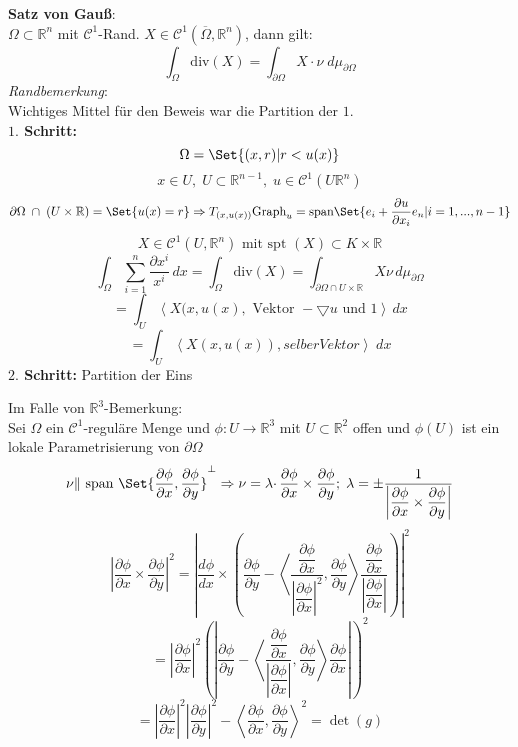 \documentclass[11pt]{memoir}
\newcommand{\pax}{\partial x}
\newcommand{\pay}{\partial y}
\newcommand{\pap}{\partial\phi}
\begin{document}
\textbf{Satz von Gauß}: \\
$\Omega \subset \mathbb R^n$ mit $\mathscr C^1$-Rand. $X \in \mathscr C^1(\overline{\Omega}, \mathbb R^n)$, dann gilt:
$$\int_\Omega \text{div} (X)  = \int_{\partial\Omega} X\cdotp \nu \;d\mu_{\partial\Omega}$$
\emph{Randbemerkung}: \\
Wichtiges Mittel für den Beweis war die Partition der $1$. \\
\textbf{$1.$ Schritt:} 
$$\Omega = \Set{(x, r) | r < u(x)}$$
$$x \in U,\; U \subset \mathbb R^{n-1},\; u \in \mathscr C^1(U \mathbb R^n)$$
$$\partial\Omega \;\cap\; (U \times \mathbb R) = \Set{u(x) = r} \Rightarrow T_{(x, u(x))}  \text{Graph}_u = \text{span}\Set{e_i + \dfrac{\partial u}{\partial  x_i}  e_n | i = 1, ..., n-1}$$
$$X \in \mathscr C^1(U, \mathbb R^n) \text{ mit spt } (X) \subset K \times \mathbb R$$
$$\int_\Omega \sum\limits_{i=1}^n \dfrac{\partial x^i}{x ^i} \, dx = \int_\Omega \text{div}(X) = \int_{\partial \Omega \cap U \times \mathbb R} X \nu \, d\mu_{\partial \Omega}$$
$$ = \int_U \left\langle X(x, u(x), \text{ Vektor }-\bigtriangledown u \text{ und }1 \right\rangle \, dx $$
$$= \int_U \left\langle X(x, u(x)), selber Vektor \right\rangle \; dx$$
\textbf{$2.$ Schritt:} Partition der Eins
\par
Im Falle von $\mathbb R^3$-Bemerkung: \\
Sei $\Omega$ ein $\mathscr C^1$-reguläre Menge und $\phi: U \rightarrow \mathbb R^3$ mit $U \subset \mathbb R^2$ offen und $\phi(U)$ ist ein lokale Parametrisierung von $\partial \Omega$
$$\nu \| \text{ span }\Set{\dfrac{\partial\phi}{\partial x}, \dfrac{\partial \phi}{\partial y}}^\bot \Rightarrow \nu = \lambda \cdotp \dfrac{\partial \phi}{\partial x} \times \dfrac{\partial \phi}{\partial y}; \; \lambda = \pm \dfrac{1}{\left| \dfrac{\partial \phi}{\partial x} \times \dfrac{\partial \phi}{\partial y}\right|}$$
$$\left\lvert\dfrac{\partial \phi}{\partial x} \times \dfrac{\partial \phi}{\partial y}\right\rvert^2 = \left\lvert\dfrac{d \phi}{d x} \times \left(  \dfrac{\pap}{\pay} - \left\langle\dfrac{ \dfrac{\pap}{\pax}}{\left\lvert\dfrac{\pap}{\pax}\right\rvert^2}, \dfrac{\pap}{\pay}\right\rangle \dfrac{ \dfrac{\pap}{\pax}}{\left\lvert\dfrac{\pap}{\pax}\right\rvert}\right) \right\rvert^2$$ 
$$= \left|\dfrac{\pap}{\pax}\right|^2 \left(\left|\dfrac{\pap}{\pay} - \left\langle\dfrac{ \dfrac{\pap}{\pax}}{\left|\dfrac{\pap}{\pax}\right|}, \dfrac{\pap}{\pay}\right\rangle \dfrac{\pap}{\pax}\right|\right)^2$$
$$= \left|\dfrac{\pap}{\pax}\right|^2\left|\dfrac{\pap}{\pay}\right|^2  - \left\langle\dfrac{\partial \phi}{\partial x} , \dfrac{\partial \phi}{\partial y}\right\rangle^2 = \det(g)$$
\end{document}
